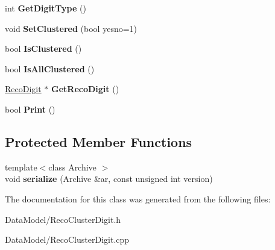 \begin{DoxyCompactItemize}
\item 
\hypertarget{classRecoClusterDigit_a43c25fb022fe47ccba3f506a71d29352}{
int {\bfseries GetDigitType} ()}
\label{classRecoClusterDigit_a43c25fb022fe47ccba3f506a71d29352}

\item 
\hypertarget{classRecoClusterDigit_a357a8d13a80019ad4b07bb096060b8b8}{
void {\bfseries SetClustered} (bool yesno=1)}
\label{classRecoClusterDigit_a357a8d13a80019ad4b07bb096060b8b8}

\item 
\hypertarget{classRecoClusterDigit_a5b5e2d3c11bf6172942ec9ebff304cd2}{
bool {\bfseries IsClustered} ()}
\label{classRecoClusterDigit_a5b5e2d3c11bf6172942ec9ebff304cd2}

\item 
\hypertarget{classRecoClusterDigit_ae19e3c19ea0a254249dac74b7c6700b9}{
bool {\bfseries IsAllClustered} ()}
\label{classRecoClusterDigit_ae19e3c19ea0a254249dac74b7c6700b9}

\item 
\hypertarget{classRecoClusterDigit_a55d53c78d90b82febf40a53ff62197e6}{
\hyperlink{classRecoDigit}{RecoDigit} $\ast$ {\bfseries GetRecoDigit} ()}
\label{classRecoClusterDigit_a55d53c78d90b82febf40a53ff62197e6}

\item 
\hypertarget{classRecoClusterDigit_ac60c305ecfa4b1436fb277daa1909db8}{
bool {\bfseries Print} ()}
\label{classRecoClusterDigit_ac60c305ecfa4b1436fb277daa1909db8}

\end{DoxyCompactItemize}
\subsection*{Protected Member Functions}
\begin{DoxyCompactItemize}
\item 
\hypertarget{classRecoClusterDigit_a24204807518703b75e8a659612949ceb}{
{\footnotesize template$<$class Archive $>$ }\\void {\bfseries serialize} (Archive \&ar, const unsigned int version)}
\label{classRecoClusterDigit_a24204807518703b75e8a659612949ceb}

\end{DoxyCompactItemize}


The documentation for this class was generated from the following files:\begin{DoxyCompactItemize}
\item 
DataModel/RecoClusterDigit.h\item 
DataModel/RecoClusterDigit.cpp\end{DoxyCompactItemize}
